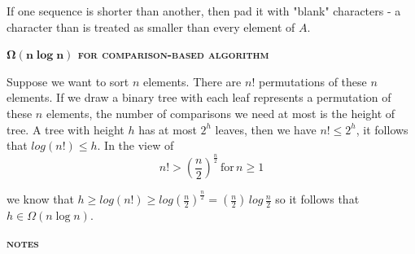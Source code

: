 \documentclass[a4paper]{article}
\begin{document}
\begin{multicols}{2}
\begin{framed}
\noindent
If one sequence is shorter than another, then pad it with "blank" characters - a character than is treated as smaller than every element of $A$.
\end{framed}

\begin{framed}
\begin{center}
	\textbf{\textsc{$\bm{\Omega(n\log n)}$ for comparison-based algorithm}}
\end{center}

\noindent
Suppose we want to sort $n$ elements. There are $n!$ permutations of these $n$ elements. If we draw a binary tree with each leaf represents a permutation of these $n$ elements, the number of comparisons we need at most is the height of tree. A tree with height $h$ has at most $2^h$ leaves, then we have $n! \leq 2^h$, it follows that $log(n!) \leq h$. In the view of $$n! > (\frac{n}{2})^\frac{n}{2} \, \text{for} \, n \geq 1$$ 

\noindent
we know that $h \geq log(n!) \geq log (\frac{n}{2})^\frac{n}{2} = (\frac{n}{2})\, log \, \frac{n}{2}$ so it follows that $h \in \Omega(n \log n)$.
\end{framed}

\begin{framed}
\begin{center}
	\textbf{\textsc{notes}}
\end{center}
\vspace{109mm}
\end{framed}
\end{multicols}
\end{document}
